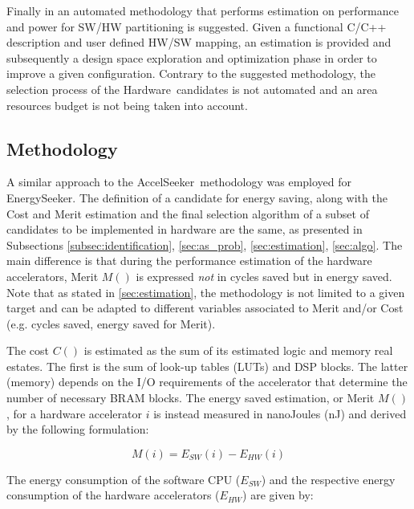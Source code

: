 \documentclass[]{usiinfthesis}
\newcommand{\aseeker}{{AccelSeeker}}
\newcommand{\eseeker}{{EnergySeeker}}
\newcommand{\HW}{{Hardware}}
\begin{document}
Finally in \cite{GruttnerNov13} an automated methodology that performs estimation on performance 
and power for SW/HW partitioning is suggested. Given a functional C/C++ description and user 
defined HW/SW mapping, an estimation is provided and subsequently a design space exploration 
and optimization phase in order to improve a given configuration. Contrary to the suggested 
methodology, the selection process of the \HW\ candidates is not automated and an area 
 resources budget is not being taken into account.
%
%
%
%
%
\subsection{Methodology}
\label{sec:meth_es}

A similar approach to the \aseeker\ methodology was employed for \eseeker. 
The definition of a candidate for energy saving, along with the Cost and Merit estimation 
and the final selection algorithm of a subset of candidates to be implemented in hardware are 
the same, as presented in Subsections \ref{subsec:identification},  
\ref{sec:as_prob}, \ref{sec:estimation}, \ref{sec:algo}. The main difference is that during
the performance estimation of the hardware accelerators, Merit $M()$ is expressed \emph{not} 
in cycles saved but in energy saved. Note that as stated in \ref{sec:estimation}, the methodology
is not limited to a given target and can be adapted to different variables associated to Merit and/or Cost
(e.g. cycles saved, energy saved for Merit).\par

The cost $C()$ is estimated as the sum of its estimated logic and memory real estates. The first is 
the sum of look-up tables (LUTs) and DSP blocks. 
The latter (memory) depends on the I/O requirements of the accelerator that determine the number of necessary 
BRAM blocks. The energy saved estimation, or Merit $M()$, for a hardware accelerator $i$ is instead 
measured in nanoJoules (nJ) and derived by the following formulation:

\begin{equation*}
M(i)  = E_{SW}(i) - E_{HW}(i)
\label{eq:energy_simple}
\end{equation*}

The energy consumption of the software CPU ($E_{SW}$) and the respective energy consumption of the hardware
accelerators ($E_{HW}$) are given by:
\end{document}

